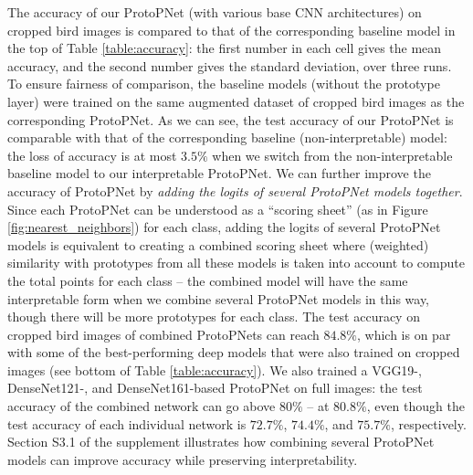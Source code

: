 \documentclass[conference]{IEEEtran}
\begin{document}
The accuracy of our ProtoPNet (with various base CNN architectures) on cropped bird images is compared to that of the corresponding baseline model in the top of Table \ref{table:accuracy}: the first number in each cell gives the mean accuracy, and the second number gives the standard deviation, over three runs.
To ensure fairness of comparison, the baseline models (without the prototype layer) were trained on the same augmented dataset of cropped bird images as the corresponding ProtoPNet. As we can see, the test accuracy of our ProtoPNet is comparable with that of the corresponding baseline (non-interpretable) model: the loss of accuracy is at most $3.5\%$ when we switch from the non-interpretable baseline model to our interpretable ProtoPNet.
We can further improve the accuracy of ProtoPNet by \textit{adding the logits of several ProtoPNet models together}. Since each ProtoPNet can be understood as a ``scoring sheet'' (as in Figure \ref{fig:nearest_neighbors}) for each class, adding the logits of several ProtoPNet models is equivalent to creating a combined scoring sheet where (weighted) similarity with prototypes from all these models is taken into account to compute the total points for each class -- the combined model will have the same interpretable form when we combine several ProtoPNet models in this way, though there will be more prototypes for each class. The test accuracy on cropped bird images of combined ProtoPNets can reach $84.8\%$, which is on par with some of the best-performing deep models that were also trained on cropped images (see bottom of Table \ref{table:accuracy}). We also trained a VGG19-, DenseNet121-, and DenseNet161-based ProtoPNet on full images: the test accuracy of the combined network can go above $80\%$ -- at $80.8\%$, even though the test accuracy of each individual network is $72.7\%$, $74.4\%$, and $75.7\%$, respectively. Section S3.1 of the supplement illustrates how combining several ProtoPNet models can improve accuracy while preserving interpretability.
\end{document}
